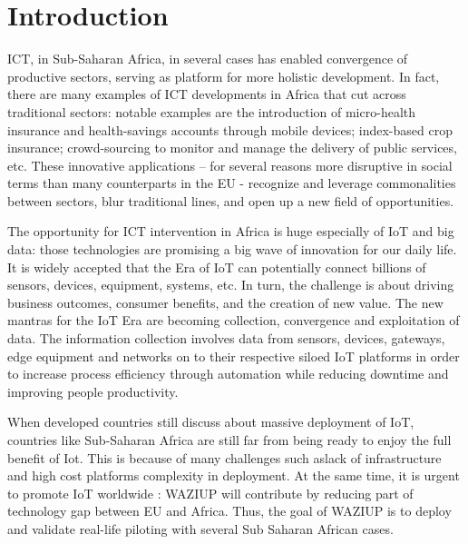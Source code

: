 
\section{Introduction}

ICT, in Sub-Saharan Africa, in several cases has enabled convergence of productive sectors, serving as platform for more holistic development.
In fact, there are many examples of ICT developments in Africa that cut across traditional sectors: notable examples are the introduction of micro-health insurance and health-savings accounts through mobile devices; index-based crop insurance; crowd-sourcing to monitor and manage the delivery of public services, etc.
These innovative applications – for several reasons more disruptive in social terms than many counterparts in the EU - recognize and leverage commonalities between sectors, blur traditional lines, and open up a new field of opportunities.

The opportunity for ICT intervention in Africa is huge especially of IoT and big data: those technologies are promising a big wave of innovation for our daily life.
It is widely accepted that the Era of IoT can potentially connect billions of sensors, devices, equipment, systems, etc.
In turn, the challenge is about driving business outcomes, consumer benefits, and the creation of new value.
The new mantras for the IoT Era are becoming collection, convergence and exploitation of data.
The information collection involves data from sensors, devices, gateways, edge equipment and networks on to their respective siloed IoT platforms in order to increase process efficiency through automation while reducing downtime and improving people productivity.

When developed countries still discuss about massive deployment of IoT, countries like Sub-Saharan Africa are still far from being ready to enjoy the full benefit of Iot. 
This is because of many challenges such aslack of infrastructure and high cost platforms complexity in deployment.
At the same time, it is urgent to promote IoT worldwide : WAZIUP will contribute by reducing part of technology gap between EU and Africa. 
Thus, the goal of WAZIUP is to deploy and validate real-life piloting with several Sub Saharan African cases. 

